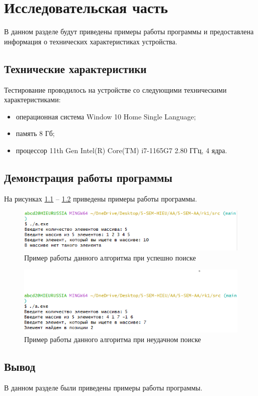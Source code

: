 \chapter{Исследовательская часть}

В данном разделе будут приведены примеры работы программы и предоставлена информация о технических характеристиках устройства.

\section{Технические характеристики}

Тестирование проводилось на устройстве со следующими техническими характеристиками:

\begin{itemize}[label=---]
	\item операционная система Window 10 Home Single Language;
	\item память 8 Гб;
	\item процессор 11th Gen Intel(R) Core(TM) i7-1165G7 2.80 ГГц, 4 ядра.
\end{itemize}

\section{Демонстрация работы программы}

На рисунках \ref{img:example} -- \ref{img:example1} приведены примеры работы программы.

\begin{figure}[h]
	\begin{center}
		\includegraphics[scale=0.9]{img/example.png}
	\end{center}
	\captionsetup{justification=centering}
	\caption{Пример работы данного алгоритма при успешно поиске}
	\label{img:example}
\end{figure}


\begin{figure}[h]
	\begin{center}
		\includegraphics[scale=0.9]{img/example1.png}
	\end{center}
	\captionsetup{justification=centering}
	\caption{Пример работы данного алгоритма при неудачном поиске}
	\label{img:example1}
\end{figure}

\section{Вывод}
В данном разделе были приведены примеры работы программы.